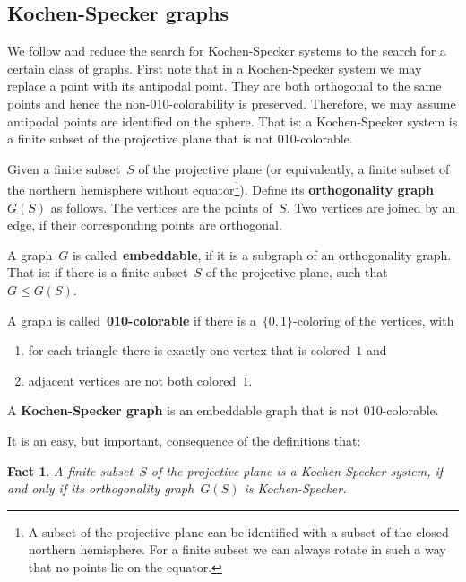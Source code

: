 \documentclass{report}
\newcommand{\keyword}[1]{\textbf{#1}}
\newtheorem{fact}{Fact}[section]
\begin{document}
\subsection{Kochen-Specker graphs}
\label{sec:ksgraphs}
We follow \cite{aow11} and reduce the search for Kochen-Specker systems
to the search for a certain class of graphs.
First note that in a Kochen-Specker system we may replace a point with its
antipodal point.  They are both orthogonal to the same points and hence
the non-010-colorability is preserved.
Therefore, we may assume antipodal points are identified on the sphere.
That is: a Kochen-Specker system is a finite subset of the projective plane
that is not 010-colorable.

\begin{definition}
Given a finite subset~$S$ of the projective plane
(or equivalently, a finite subset of the northern
hemisphere without equator\footnote{%
    A subset of the projective plane can be identified with
    a subset of the closed northern hemisphere.
    For a finite subset we can always rotate in such a way
    that no points lie on the equator.}).
Define its \keyword{orthogonality graph}~$G(S)$ as follows.
The vertices are the points of~$S$.
Two vertices are joined by an edge, if their corresponding points
are orthogonal.
\end{definition}
\begin{definition}
A graph~$G$ is called~\keyword{embeddable},
if it is a subgraph of an orthogonality graph.
That is: if there is a finite subset~$S$ of the projective plane,
such that~$G \leq G(S)$.
\end{definition}
\begin{definition}
A graph is called~\keyword{010-colorable}
if there is a~$\{0,1\}$-coloring of the vertices,
with
\begin{enumerate}
\item
for each triangle there is exactly one vertex that is colored~$1$ and
\item
adjacent vertices are not both colored~$1$.
\end{enumerate}
\end{definition}


\begin{definition}
A \keyword{Kochen-Specker graph}
is an embeddable graph that is not 010-colorable.
\end{definition}
It is an easy, but important, consequence of the definitions that:
\begin{fact}
    A finite subset~$S$ of the projective plane
    is a Kochen-Specker system,
    if and only if its orthogonality graph~$G(S)$
    is Kochen-Specker.
\end{fact}
\end{document}
